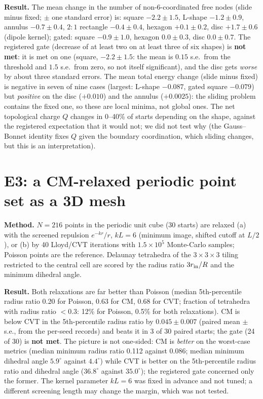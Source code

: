 \documentclass[11pt,a4paper]{article}
\begin{document}
\textbf{Result.} The mean change in the number of non-6-coordinated free nodes (slide minus fixed; $\pm$ one standard error) is: square $-2.2\pm1.5$,
L-shape $-1.2\pm0.9$, annulus $-0.7\pm0.4$, $2{:}1$ rectangle $-0.4\pm0.4$, hexagon $+0.1\pm0.2$, disc $+1.7\pm0.6$ (dipole kernel);
gated: square $-0.9\pm1.0$, hexagon $0.0\pm0.3$, disc $0.0\pm0.7$. The registered gate (decrease of at least two on at least
three of six shapes) is \textbf{not met}: it is met on one (square, $-2.2\pm1.5$: the mean is $0.15$ s.e.\ from the threshold and $1.5$ s.e.\ from zero, so
not itself significant), and the disc gets \emph{worse} by about three standard errors. The mean total energy change (slide minus fixed) is
negative in seven of nine cases (largest: L-shape $-0.087$, gated square $-0.079$) but \emph{positive} on the disc ($+0.010$) and the
annulus ($+0.0025$): the sliding problem contains the fixed one, so these are local minima, not global ones. The net topological
charge $Q$ changes in 0--40\% of starts depending on the shape, against the registered expectation that it would not; we did not test
why (the Gauss--Bonnet identity fixes $Q$ given the boundary coordination, which sliding changes, but this is an interpretation).

\section{E3: a CM-relaxed periodic point set as a 3D mesh}

\textbf{Method.} $N=216$ points in the periodic unit cube (30 starts) are relaxed (a) with the screened repulsion $e^{-kr}/r$,
$kL=6$ (minimum image, shifted cutoff at $L/2$), or (b) by 40 Lloyd/CVT iterations with $1.5\times10^5$ Monte-Carlo samples; Poisson
points are the reference. Delaunay tetrahedra of the $3\times3\times3$ tiling restricted to the central cell are scored by the
radius ratio $3r_{\rm in}/R$ and the minimum dihedral angle.

\textbf{Result.} Both relaxations are far better than Poisson (median 5th-percentile radius ratio 0.20 for Poisson, 0.63 for CM, 0.68
for CVT; fraction of tetrahedra with radius ratio $<0.3$: 12\% for Poisson, 0.5\% for both relaxations). CM is below CVT in the
5th-percentile radius ratio by $0.045\pm0.007$ (paired mean $\pm$ s.e., from the per-seed records) and beats it in 3 of 30 paired starts;
the gate (24 of 30) is \textbf{not met}. The picture is not one-sided: CM is \emph{better} on the worst-case metrics (median minimum radius ratio
0.112 against 0.086; median minimum dihedral angle $5.9^\circ$ against $4.4^\circ$) while CVT is better on the 5th-percentile
radius ratio and dihedral angle ($36.8^\circ$ against $35.0^\circ$); the registered gate concerned only the former. The kernel
parameter $kL=6$ was fixed in advance and not tuned; a different screening length may change the margin, which was not tested.
\end{document}
